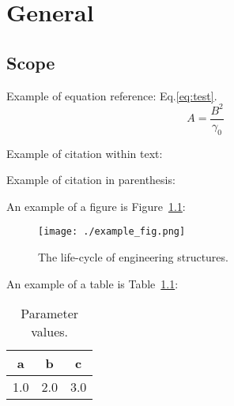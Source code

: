 \chapter{General}
\section{Scope}
Example of equation reference: Eq.\eqref{eq:test}.
\begin{equation}\label{eq:test}
    A=\dfrac{B^2}{\gamma_0}
\end{equation}

Example of citation within text: \textcite{Jensen1906}\par
Example of citation in parenthesis:
\parencite{Hasofer1974}

An example of a figure is Figure~\ref{fig:lifecycle}:
\begin{figure}[h!]
  \centering
    \texttt{[image: ./example\_fig.png]}
    \vspace*{-20pt}\caption{The life-cycle of engineering structures.}
    \label{fig:lifecycle}
\end{figure}

An example of a table is Table~\ref{tab:tab1}:
\begin{table}[h!]
  \caption{Parameter values.}
  \label{tab:label}
  \centering
    \begin{tabular}{|c|c|c|}
      \hline
      a & b & c \\
      \hline
      1.0 & 2.0 & 3.0 \\
      \hline
    \end{tabular}
    \label{tab:tab1}
\end{table}
